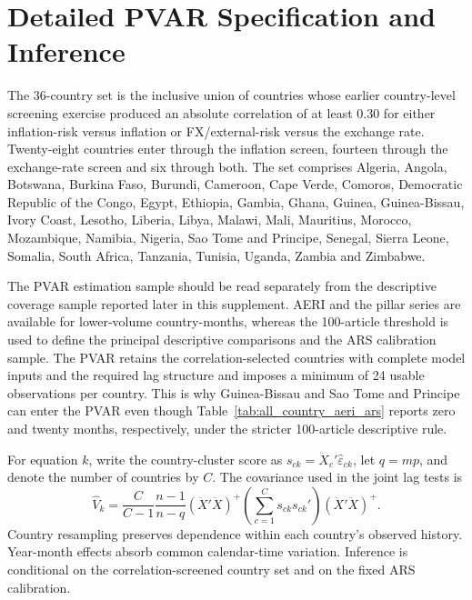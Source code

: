 \documentclass[11pt]{article}
\begin{document}
\section{Detailed PVAR Specification and Inference}\label{app:pvar}




The 36-country set is the inclusive union of countries whose earlier country-level screening exercise produced an absolute correlation of at least 0.30 for either inflation-risk versus inflation or FX/external-risk versus the exchange rate. Twenty-eight countries enter through the inflation screen, fourteen through the exchange-rate screen and six through both. The set comprises Algeria, Angola, Botswana, Burkina Faso, Burundi, Cameroon, Cape Verde, Comoros, Democratic Republic of the Congo, Egypt, Ethiopia, Gambia, Ghana, Guinea, Guinea-Bissau, Ivory Coast, Lesotho, Liberia, Libya, Malawi, Mali, Mauritius, Morocco, Mozambique, Namibia, Nigeria, Sao Tome and Principe, Senegal, Sierra Leone, Somalia, South Africa, Tanzania, Tunisia, Uganda, Zambia and Zimbabwe.

The PVAR estimation sample should be read separately from the descriptive coverage sample reported later in this supplement. AERI and the pillar series are available for lower-volume country-months, whereas the 100-article threshold is used to define the principal descriptive comparisons and the ARS calibration sample. The PVAR retains the correlation-selected countries with complete model inputs and the required lag structure and imposes a minimum of 24 usable observations per country. This is why Guinea-Bissau and Sao Tome and Principe can enter the PVAR even though Table~\ref{tab:all_country_aeri_ars} reports zero and twenty months, respectively, under the stricter 100-article descriptive rule.

For equation $k$, write the country-cluster score as $s_{ck}=\ddot X_c'\widehat\varepsilon_{ck}$, let $q=mp$, and denote the number of countries by $C$. The covariance used in the joint lag tests is
\begin{equation}
\widehat V_k=
\frac{C}{C-1}\frac{n-1}{n-q}
(\ddot X'\ddot X)^+
\left(\sum_{c=1}^{C}s_{ck}s_{ck}'\right)
(\ddot X'\ddot X)^+.
\end{equation}
Country resampling preserves dependence within each country's observed history. Year-month effects absorb common calendar-time variation. Inference is conditional on the correlation-screened country set and on the fixed ARS calibration.
\end{document}
